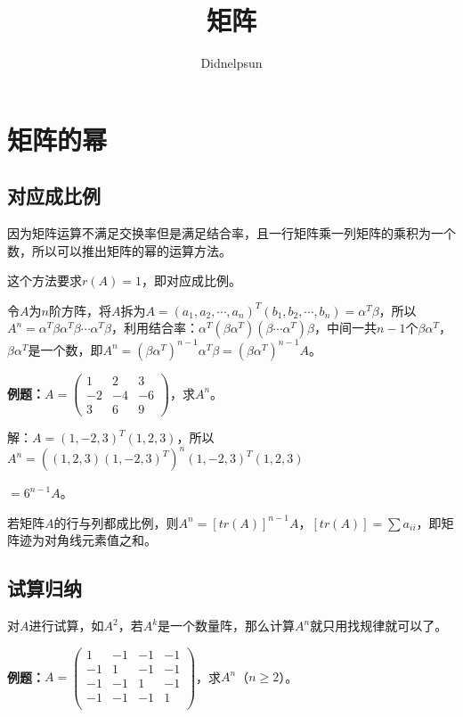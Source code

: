 \documentclass[UTF8, 12pt]{ctexart}
\author{Didnelpsun}
\title{矩阵}
\date{}
\begin{document}
\maketitle
\pagestyle{empty}
\thispagestyle{empty}
\tableofcontents
\thispagestyle{empty}
\newpage
\pagestyle{plain}
\setcounter{page}{1}
\section{矩阵的幂}

\subsection{对应成比例}

因为矩阵运算不满足交换率但是满足结合率，且一行矩阵乘一列矩阵的乘积为一个数，所以可以推出矩阵的幂的运算方法。

这个方法要求$r(A)=1$，即对应成比例。

令$A$为$n$阶方阵，将$A$拆为$A=(a_1,a_2,\cdots,a_n)^T(b_1,b_2,\cdots,b_n)=\alpha^T\beta$，所以$A^n=\alpha^T\beta\alpha^T\beta\cdots\alpha^T\beta$，利用结合率：$\alpha^T(\beta\alpha^T)(\beta\cdots\alpha^T)\beta$，中间一共$n-1$个$\beta\alpha^T$，$\beta\alpha^T$是一个数，即$A^n=(\beta\alpha^T)^{n-1}\alpha^T\beta=(\beta\alpha^T)^{n-1}A$。\medskip

\textbf{例题：}$A=\left(\begin{array}{ccc}
    1 & 2 & 3 \\
    -2 & -4 & -6 \\
    3 & 6 & 9
\end{array}\right)$，求$A^n$。\medskip

解：$A=(1,-2,3)^T(1,2,3)$，所以$A^n=((1,2,3)(1,-2,3)^T)^n(1,-2,3)^T(1,2,3)$

$=6^{n-1}A$。

若矩阵$A$的行与列都成比例，则$A^n=[tr(A)]^{n-1}A$，$[tr(A)]=\sum a_{ii}$，即矩阵迹为对角线元素值之和。

\subsection{试算归纳}

对$A$进行试算，如$A^2$，若$A^k$是一个数量阵，那么计算$A^n$就只用找规律就可以了。

\textbf{例题：}$A=\left(\begin{array}{cccc}
    1 & -1 & -1 & -1 \\
    -1 & 1 & -1 & -1 \\
    -1 & -1 & 1 & -1 \\
    -1 & -1 & -1 & 1 \\
\end{array}\right)$，求$A^n$（$n\geqslant2$）。\medskip
\end{document}
